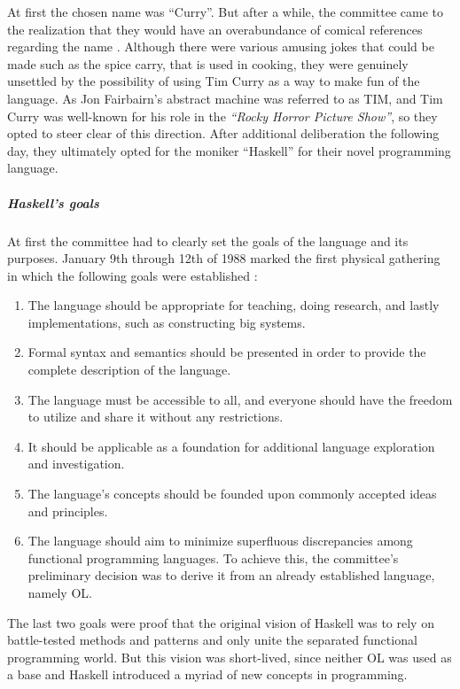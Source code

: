 \documentclass[a4paper, titlepage, twoside]{article}
\begin{document}
At first the chosen name was ``Curry''. But after a while, the committee came to the realization that they would have an overabundance of comical references regarding the name \autocite{hudakHistoryHaskellBeing2007}. Although there were various amusing jokes that could be made such as the spice carry, that is used in cooking, they were genuinely unsettled by the possibility of using Tim Curry as a way to make fun of the language.
As Jon Fairbairn's abstract machine was referred to as TIM, and Tim Curry was well-known for his role in the \emph{``Rocky Horror Picture Show''}, so they opted to steer clear of this direction. After additional deliberation the following day, they ultimately opted for the moniker ``Haskell'' for their novel programming language.

\subparagraph*{Haskell's goals}
\label{sec:org439d4a0}

At first the committee had to clearly set the goals of the language and its purposes. January 9th through 12th of 1988 marked the first physical gathering in which the following goals were established \autocite{hudakHistoryHaskellBeing2007}:

\begin{enumerate}
\item The language should be appropriate for teaching, doing research, and lastly implementations, such as constructing big systems.

\item Formal syntax and semantics should be presented in order to provide the complete description of the language.

\item The language must be accessible to all, and everyone should have the freedom to utilize and share it without any restrictions.

\item It should be applicable as a foundation for additional language exploration and investigation.

\item The language's concepts should be founded upon commonly accepted ideas and principles.

\item The language should aim to minimize superfluous discrepancies among functional programming languages. To achieve this, the committee's preliminary decision was to derive it from an already established language, namely OL.
\end{enumerate}

The last two goals were proof that the original vision of Haskell was to rely on battle-tested methods and patterns and only unite the separated functional programming world. But this vision was short-lived, since neither OL was used as a base and Haskell introduced a myriad of new concepts in programming.
\end{document}
